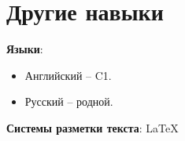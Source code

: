 \documentclass[a4paper,11pt]{article}
\begin{document}
\section{Другие навыки}
\begin{itemize}[leftmargin=0.15in, label={}]
    \normalsize{\item{
                    \textbf{Языки}{:}
                    \begin{itemize}
                        \item Английский -- C1.
                        \item Русский -- родной.
                    \end{itemize}
                    \textbf{Системы разметки текста}{: \LaTeX} \\
              }}
\end{itemize}

\newcommand{\talkentry}[2]{%
    \item %
    \noindent %
    \begin{tabularx}{\linewidth}[t]{@{} X @{\hspace{2em}} r @{}}
        #1 & %
        #2   %
    \end{tabularx}%
}

\end{document}
